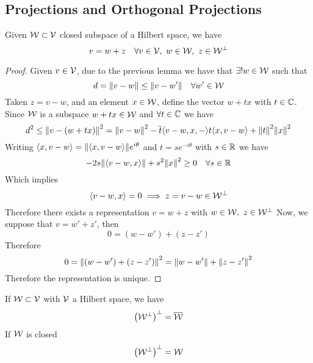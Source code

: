 \documentclass[../complete.tex]{subfiles}
\begin{document}
\subsection{Projections and Orthogonal Projections}
\begin{thm}[Projection]
	Given $\mathcal{W}\subset\mathcal{V}$ closed subspace of a Hilbert space, we have
	\begin{equation*}
		v=w+z\quad\forall v\in\V,\ w\in\W,\ z\in\W^\perp
	\end{equation*}
\end{thm}
\begin{proof}
	Given $v\in\mathcal{V}$, due to the previous lemma we have that $\exists!w\in\mathcal{W}$ such that
	\begin{equation*}
		d=\norm{v-w}\le\norm{v-w'}\quad\forall w'\in\mathcal{W}
	\end{equation*}
	Taken $z=v-w$, and an element $x\in\mathcal{W}$, define the vector $w+tx$ with $t\in\mathbb{C}$. Since $\mathcal{W}$ is a subspace $w+tx\in\mathcal{W}$ and $\forall t\in\mathbb{C}$ we have
	\begin{equation*}
		d^2\le\norm{v-(w+tx)}^2=\norm{v-w}^2-\overline{t}\langle v-w,x, - \rangle t\langle x, v-w \rangle+\norm{t}^2\norm{x}^2
	\end{equation*}
	Writing $\langle x, v-w \rangle=\norm{\langle x, v-w \rangle}e^{i\theta}$ and $t=se^{-i\theta}$ with $s\in\mathbb{R}$ we have
	\begin{equation*}
		-2s\norm{\langle v-w, x \rangle}+s^2\norm{x}^2\ge0\quad\forall s\in\mathbb{R}
	\end{equation*}
	Which implies
	\begin{equation*}
		\langle v-w, x \rangle=0\implies z=v-w\in\mathcal{W}^\perp
	\end{equation*}
	Therefore there exists a representation $v=w+z$ with $w\in\mathcal{W},\ z\in\mathcal{W}^\perp$
	Now, we suppose that $v=w'+z'$, then
	\begin{equation*}
		0=(w-w')+(z-z')
	\end{equation*}
	Therefore
	\begin{equation*}
		0=\norm{(w-w')+(z-z')}^2=\norm{w-w'}+\norm{z-z'}^2
	\end{equation*}
	Therefore the representation is unique.
\end{proof}
\begin{thm}
	If $\mathcal{W}\subset\mathcal{V}$ with $\mathcal{V}$ a Hilbert space, we have
	\begin{equation*}
		\left( \mathcal{W}^\perp \right)^\perp=\overline{\mathcal{W}}
	\end{equation*}
	If $\mathcal{W}$ is closed
	\begin{equation*}
		\left( \mathcal{W}^\perp \right)^\perp=\mathcal{W}
	\end{equation*}
\end{thm}
\end{document}

